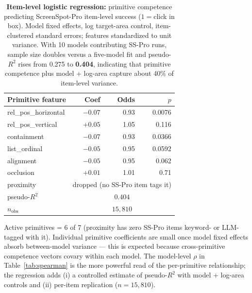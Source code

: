 \begin{table}[t]
\centering
\small
\begin{threeparttable}
\caption{\textbf{Item-level logistic regression:} primitive competence
predicting ScreenSpot-Pro item-level success ($1{=}$click in box). Model
fixed effects, log target-area control, item-clustered standard errors;
features standardized to unit variance. With 10 models contributing
SS-Pro runs, sample size doubles versus a five-model fit and pseudo-$R^2$
rises from 0.275 to \textbf{0.404}, indicating that primitive competence
plus model + log-area capture about 40\% of item-level variance.}
\label{tab:regression}
\begin{tabular}{@{}lrrr@{}}
\toprule
\textbf{Primitive feature} & \textbf{Coef} & \textbf{Odds} & \textbf{$p$} \\
\midrule
rel\_pos\_horizontal & $-0.07$   & 0.93  & 0.0076 \\
rel\_pos\_vertical   & $+0.05$   & 1.05  & 0.116  \\
containment          & $-0.07$   & 0.93  & 0.0366 \\
list\_ordinal        & $-0.05$   & 0.95  & 0.0592 \\
alignment            & $-0.05$   & 0.95  & 0.062  \\
occlusion            & $+0.01$   & 1.01  & 0.71   \\
\midrule
proximity            & \multicolumn{3}{c}{dropped (no SS-Pro item tags it)} \\
\bottomrule
pseudo-$R^2$         & \multicolumn{3}{c}{$\mathbf{0.404}$} \\
$n_{\mathrm{obs}}$    & \multicolumn{3}{c}{$15{,}810$} \\
\bottomrule
\end{tabular}
\begin{tablenotes}
\footnotesize
\item Active primitives = 6 of 7 (proximity has zero SS-Pro items
keyword- or LLM-tagged with it). Individual primitive coefficients are
small once model fixed effects absorb between-model variance --- this
is expected because cross-primitive competence vectors covary within
each model. The model-level $\rho$ in Table~\ref{tab:spearman} is the
more powerful read of the per-primitive relationship; the regression
adds (i) a controlled estimate of pseudo-$R^2$ with model + log-area
controls and (ii) per-item replication ($n{=}15{,}810$).
\end{tablenotes}
\end{threeparttable}
\end{table}


